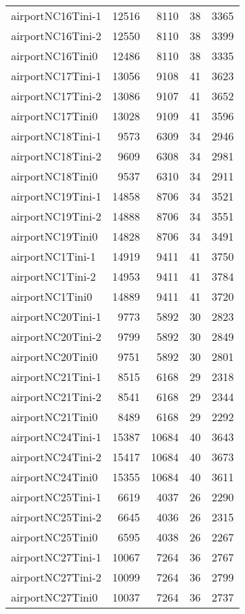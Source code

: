 \begin{longtable}{lrrrr}
airportNC16Tini-1 & 12516 & 8110 & 38 & 3365 \\
airportNC16Tini-2 & 12550 & 8110 & 38 & 3399 \\
airportNC16Tini0 & 12486 & 8110 & 38 & 3335 \\
airportNC17Tini-1 & 13056 & 9108 & 41 & 3623 \\
airportNC17Tini-2 & 13086 & 9107 & 41 & 3652 \\
airportNC17Tini0 & 13028 & 9109 & 41 & 3596 \\
airportNC18Tini-1 & 9573 & 6309 & 34 & 2946 \\
airportNC18Tini-2 & 9609 & 6308 & 34 & 2981 \\
airportNC18Tini0 & 9537 & 6310 & 34 & 2911 \\
airportNC19Tini-1 & 14858 & 8706 & 34 & 3521 \\
airportNC19Tini-2 & 14888 & 8706 & 34 & 3551 \\
airportNC19Tini0 & 14828 & 8706 & 34 & 3491 \\
airportNC1Tini-1 & 14919 & 9411 & 41 & 3750 \\
airportNC1Tini-2 & 14953 & 9411 & 41 & 3784 \\
airportNC1Tini0 & 14889 & 9411 & 41 & 3720 \\
airportNC20Tini-1 & 9773 & 5892 & 30 & 2823 \\
airportNC20Tini-2 & 9799 & 5892 & 30 & 2849 \\
airportNC20Tini0 & 9751 & 5892 & 30 & 2801 \\
airportNC21Tini-1 & 8515 & 6168 & 29 & 2318 \\
airportNC21Tini-2 & 8541 & 6168 & 29 & 2344 \\
airportNC21Tini0 & 8489 & 6168 & 29 & 2292 \\
airportNC24Tini-1 & 15387 & 10684 & 40 & 3643 \\
airportNC24Tini-2 & 15417 & 10684 & 40 & 3673 \\
airportNC24Tini0 & 15355 & 10684 & 40 & 3611 \\
airportNC25Tini-1 & 6619 & 4037 & 26 & 2290 \\
airportNC25Tini-2 & 6645 & 4036 & 26 & 2315 \\
airportNC25Tini0 & 6595 & 4038 & 26 & 2267 \\
airportNC27Tini-1 & 10067 & 7264 & 36 & 2767 \\
airportNC27Tini-2 & 10099 & 7264 & 36 & 2799 \\
airportNC27Tini0 & 10037 & 7264 & 36 & 2737 \\

\end{longtable}
